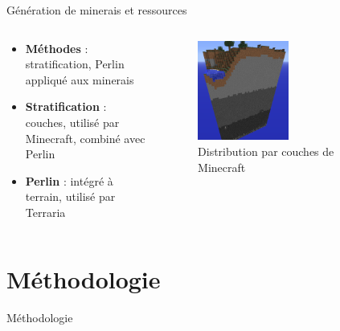 \documentclass[aspectratio=169]{beamer}
\begin{document}
\begin{frame}{Génération de minerais et ressources}
    \begin{columns}
        \centering
        \begin{column}{0.5\textwidth}
            \centering
            \begin{itemize}
                \item \textbf{Méthodes} : stratification, Perlin appliqué aux minerais
                \item \textbf{Stratification} : couches, utilisé par Minecraft, combiné avec Perlin
                \item \textbf{Perlin} : intégré à terrain, utilisé par Terraria
            \end{itemize}
        \end{column}
        \begin{column}{0.5\textwidth}
            \centering
            \begin{figure}
                \centering
                \captionsetup{format=sanslabel}
                \includegraphics[width=0.5\textwidth]{assets/stratification.png}
                \caption{Distribution par couches de Minecraft}
            \end{figure}
        \end{column}
    \end{columns}
\end{frame}


\section{Méthodologie}

\begin{frame}{Méthodologie}
    \tableofcontents[sections={3}]
\end{frame}
\end{document}
